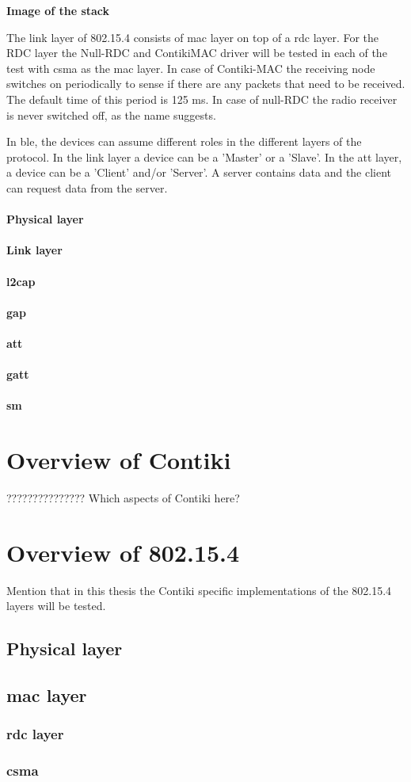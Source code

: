 \textbf{Image of the stack}

The link layer of 802.15.4 consists of \gls{mac} layer on top of a \gls{rdc} layer. For the RDC layer the Null-RDC and ContikiMAC driver will be tested in each of the test with \gls{csma} as the \gls{mac} layer. In case of Contiki-MAC the receiving node switches on periodically to sense if there are any packets that need to be received. The default time of this period is 125 ms. In case of null-RDC the radio receiver is never switched off, as the name suggests.

In \gls{ble}, the devices can assume different roles in the different layers of the protocol. In the link layer a device can be a 'Master' or a 'Slave'. In the \gls{att} layer, a device can be a 'Client' and/or 'Server'. A server contains data and the client can request data from the server.

\paragraph{Physical layer}
\paragraph{Link layer}
\paragraph{\gls{l2cap}}
\paragraph{\gls{gap}}
\paragraph{\gls{att}}
\paragraph{\gls{gatt}}
\paragraph{\gls{sm}}

\section{Overview of Contiki}
??????????????? Which aspects of Contiki here?

\section{Overview of 802.15.4}
Mention that in this thesis the Contiki specific implementations of the 802.15.4 layers will be tested.

\subsection{Physical layer}

\subsection{\gls{mac} layer}
\subsubsection{\gls{rdc} layer}
\subsubsection{\gls{csma}}


